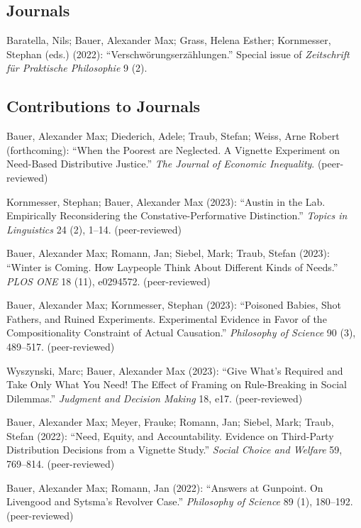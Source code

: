 \documentclass[a4paper,10pt]{article}
\newenvironment{literature}{%
   \parskip6pt\parindent0pt\raggedright
   \def\lititem{\hangindent=1cm\hangafter1}}{%
   \par\ignorespaces}
\begin{document}
\subsection*{Journals}
\begin{literature}
\lititem Baratella, Nils; Bauer, Alexander Max; Grass, Helena Esther; Kornmesser, Stephan (eds.) (2022): \enquote{Verschwörungserzählungen.} Special issue of \textit{Zeitschrift für Praktische Philosophie} 9 (2).
\end{literature}

\subsection*{Contributions to Journals}
\begin{literature}
\lititem Bauer, Alexander Max; Diederich, Adele; Traub, Stefan; Weiss, Arne Robert (forthcoming): \enquote{When the Poorest are Neglected. A Vignette Experiment on Need-Based Distributive Justice.} \textit{The Journal of Economic Inequality}. (peer-reviewed)

\lititem Kornmesser, Stephan; Bauer, Alexander Max (2023): \enquote{Austin in the Lab. Empirically Reconsidering the Constative-Performative Distinction.} \textit{Topics in Linguistics} 24 (2), 1--14. (peer-reviewed)

\lititem Bauer, Alexander Max; Romann, Jan; Siebel, Mark; Traub, Stefan (2023): \enquote{Winter is Coming. How Laypeople Think About Different Kinds of Needs.} \textit{PLOS ONE} 18 (11), e0294572. (peer-reviewed)

\lititem Bauer, Alexander Max; Kornmesser, Stephan (2023): \enquote{Poisoned Babies, Shot Fathers, and Ruined Experiments. Experimental Evidence in Favor of the Compositionality Constraint of Actual Causation.} \textit{Philosophy of Science} 90 (3), 489--517. (peer-reviewed)

\lititem Wyszynski, Marc; Bauer, Alexander Max (2023): \enquote{Give What's Required and Take Only What You Need! The Effect of Framing on Rule-Breaking in Social Dilemmas.} \textit{Judgment and Decision Making} 18, e17. (peer-reviewed)

\lititem Bauer, Alexander Max; Meyer, Frauke; Romann, Jan; Siebel, Mark; Traub, Stefan (2022): \enquote{Need, Equity, and Accountability. Evidence on Third-Party Distribution Decisions from a Vignette Study.} \textit{Social Choice and Welfare} 59, 769--814. (peer-reviewed)

\lititem Bauer, Alexander Max; Romann, Jan (2022): \enquote{Answers at Gunpoint. On Livengood and Sytsma's Revolver Case.} \textit{Philosophy of Science} 89 (1), 180--192. (peer-reviewed)


\end{literature}
\end{document}

